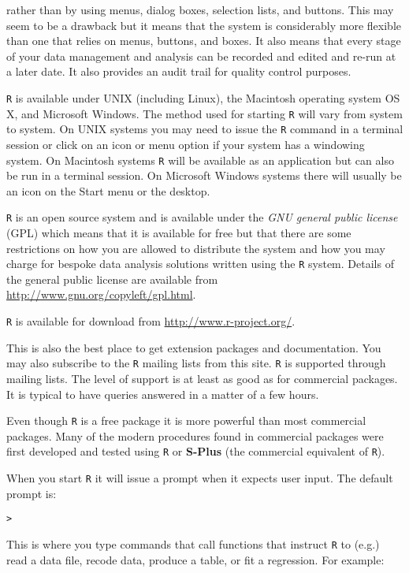 \documentclass[]{book}
\theoremstyle{definition}
\theoremstyle{definition}
\theoremstyle{definition}
\theoremstyle{remark}
\begin{document}
rather than by using menus, dialog boxes, selection lists, and buttons.
This may seem to be a drawback but it means that the system is
considerably more flexible than one that relies on menus, buttons, and
boxes. It also means that every stage of your data management and
analysis can be recorded and edited and re-run at a later date. It also
provides an audit trail for quality control purposes.

\texttt{R} is available under UNIX (including Linux), the Macintosh
operating system OS X, and Microsoft Windows. The method used for
starting \texttt{R} will vary from system to system. On UNIX systems you
may need to issue the \texttt{R} command in a terminal session or click
on an icon or menu option if your system has a windowing system. On
Macintosh systems \texttt{R} will be available as an application but can
also be run in a terminal session. On Microsoft Windows systems there
will usually be an icon on the Start menu or the desktop.

\texttt{R} is an open source system and is available under the \emph{GNU
general public license} (GPL) which means that it is available for free
but that there are some restrictions on how you are allowed to
distribute the system and how you may charge for bespoke data analysis
solutions written using the \texttt{R} system. Details of the general
public license are available from
\url{http://www.gnu.org/copyleft/gpl.html}.

\texttt{R} is available for download from
\url{http://www.r-project.org/}.

This is also the best place to get extension packages and documentation.
You may also subscribe to the \texttt{R} mailing lists from this site.
\texttt{R} is supported through mailing lists. The level of support is
at least as good as for commercial packages. It is typical to have
queries answered in a matter of a few hours.

Even though \texttt{R} is a free package it is more powerful than most
commercial packages. Many of the modern procedures found in commercial
packages were first developed and tested using \texttt{R} or
\textbf{S-Plus} (the commercial equivalent of \texttt{R}).

When you start \texttt{R} it will issue a prompt when it expects user
input. The default prompt is:

\begin{verbatim}
>
\end{verbatim}

This is where you type commands that call functions that instruct
\texttt{R} to (e.g.) read a data file, recode data, produce a table, or
fit a regression. For example:
\end{document}
